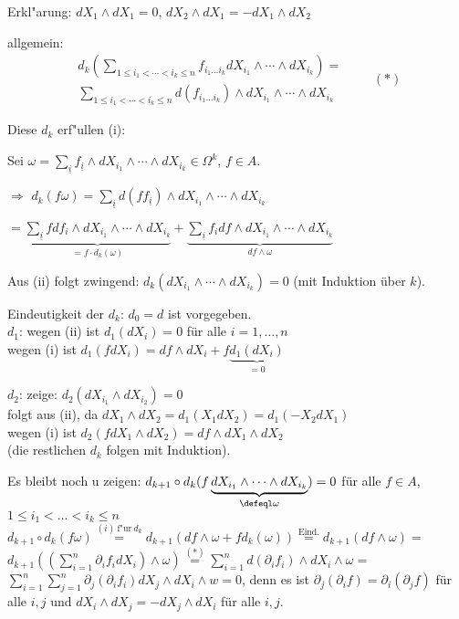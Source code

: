 \begin{SatzDef}
\begin{Bew}
Erkl"arung: $dX_1 \wedge dX_1 = 0$, $dX_2 \wedge dX_1 = - dX_1 \wedge dX_2$

allgemein:
\begin{equation*}
\begin{split}
 d_k(\displaystyle\sum_{1 \leq i_1 < \cdots < i_k \leq n} f_{i_1 \ldots i_k}
dX_{i_1} \wedge \cdots \wedge dX_{i_k}) =\\
\sum_{1 \leq i_1 < \cdots < i_k \leq n} d(f_{i_1 \ldots i_k}) \wedge dX_{i_1}
\wedge \cdots \wedge dX_{i_k} 
\end{split}
\qquad (\ast)
\end{equation*}

Diese $d_k$ erf"ullen (i):

Sei $\omega = \sum_{\underline{i}} f_{\underline{i}} \wedge dX_{i_1} \wedge \cdots \wedge dX_{i_k} \in \Omega^k$, $f \in A$.

$\Rightarrow$ $d_k(f \omega) = \sum_{\underline{i}} d(f f_{\underline{i}}) \wedge dX_{i_1} \wedge \cdots \wedge dX_{i_k}$

$= \underbrace{ \sum_{\underline{i}} f df_i \wedge dX_{i_1} \wedge \cdots \wedge dX_{i_k} }_{= f \cdot d_k(\omega)} + \underbrace{ \sum_{\underline{i}} f_i df \wedge dX_{i_1} \wedge \cdots \wedge dX_{i_k} }_{d f \wedge \omega}$

Aus (ii) folgt zwingend: $d_k(dX_{i_1}\wedge \cdots \wedge dX_{i_k}) = 0$ (mit 
Induktion \"uber $k$).

Eindeutigkeit der $d_k$: $d_0=d$ ist vorgegeben.\\
$d_1$: wegen (ii) ist $d_1(dX_i)=0$ f\"ur alle $i=1, \ldots, n$\\
wegen (i) ist $d_1(fdX_i)=df\wedge dX_i+f\underbrace{d_1(dX_i)}_{=0}$

$d_2$: zeige: $d_2(dX_{i_1}\wedge dX_{i_2})=0$\\
folgt aus (ii), da $dX_1\wedge dX_2=d_1(X_1 dX_2)=d_1(-X_2dX_1)$\\
wegen (i) ist $d_2(fdX_1\wedge dX_2)=df\wedge dX_1\wedge dX_2$\\
(die restlichen $d_k$ folgen mit Induktion).

Es bleibt noch 	u zeigen: $d_{k+1}\circ d_k(f\underbrace{dX_{i_1}\wedge \cdots
\wedge
dX_{i_k}}_{\defeql \omega})=0$ f\"ur alle $f\in A$, $1\leq i_1<\dots<i_k\leq n$\\
$d_{k+1}\circ d_k(f\omega)
\stackrel{(i)\ \text{f"ur}\ d_k}{=}d_{k+1}(df\wedge \omega +fd_k(\omega))
\stackrel{\text{Eind.}}{=}d_{k+1}(df\wedge \omega) 
=$\\
$d_{k+1}\left(\left(\sum_{i=1}^{n}\partial_i f_i dX_i\right)\wedge
\omega\right)
\stackrel{(\ast)}{=}\sum_{i=1}^{n}d(\partial_if_i)\wedge dX_i\wedge \omega=$\\
$\sum_{i=1}^n \sum_{j=1}^n \partial_j (\partial_i f_i)dX_j\wedge dX_{i}\wedge w=0$,
denn es ist $\partial_j(\partial_i f) = \partial_i(\partial_j f)$ f\"ur alle $i,j$
und $dX_i\wedge dX_j=-dX_j\wedge dX_i$ f\"ur alle $i,j$.


\end{Bew}
\end{SatzDef}
